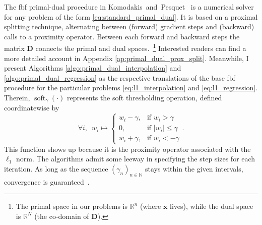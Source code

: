 The \acrfull{fbf} primal-dual procedure in Komodakis~and~Pesquet~\cite[Algorithm~6]{komodakis2015} is a numerical solver for any problem of the form \eqref{eq:standard_primal_dual}. It is based on a proximal splitting technique, alternating between (forward) gradient steps and (backward) calls to a proximity operator. Between each forward and backward steps the matrix $\mathbf{D}$ connects the primal and dual spaces.~\footnote{The primal space in our problems is $\mathbb{R}^{n}$ (where $\mathbf{x}$ lives), while the dual space is $\mathbb{R}^{N}$ (the co-domain of $\mathbf{D}$).} Interested readers can find a more detailed account in Appendix \ref{ap:primal_dual_prox_split}. Meanwhile, I present Algorithms \ref{algo:primal_dual_interpolation} and \ref{algo:primal_dual_regression} as the respective translations of the base \acrshort{fbf} procedure for the particular problems \eqref{eq:l1_interpolation} and \eqref{eq:l1_regression}. Therein, $\operatorname{soft}_{\gamma} (\cdot)$ represents the soft thresholding operation, defined coordinatewise by
\begin{equation*}
    \forall i, \enspace w_i \mapsto \left\{
        \begin{matrix}
            w_i - \gamma, & \text{if } w_i > \gamma\\
            0, & \text{if } |w_i| \leq \gamma\\
            w_i + \gamma, & \text{if } w_i < -\gamma
        \end{matrix}
    \right. .
\end{equation*}
This function shows up because it is the proximity operator associated with the $\ell_1$ norm. The algorithms admit some leeway in specifying the step sizes for each iteration. As long as the sequence $(\gamma_n)_{n \in \mathbb{N}}$ stays within the given intervals, convergence is guaranteed~\cite{komodakis2015}.

